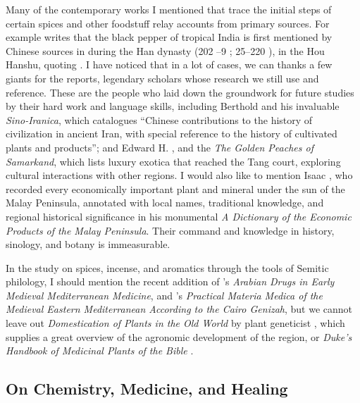 
Many of the contemporary works I mentioned that trace the initial steps of certain spices and other foodstuff relay accounts from primary sources. For example \textcite{spengler_spices_2019} writes that the black pepper of tropical India is first mentioned by Chinese sources in during the Han dynasty (202 \BC{}--9 \AD{}; 25--220 \AD{}), in the \gls{Hou Hanshu}, quoting \textcite[374]{laufer_sino-iranica_1919}. I have noticed that in a lot of cases, we can thanks a few giants for the reports, legendary scholars whose research we still use and reference. These are the people who laid down the groundwork for future studies by their hard work and language skills, including Berthold \textcite{laufer_sino-iranica_1919} and his invaluable \textit{Sino-Iranica}, which catalogues ``Chinese contributions to the history of civilization in ancient Iran, with special reference to the history of cultivated plants and products''; and Edward H. \textcite{schafer_golden_1985}, and the \textit{The Golden Peaches of Samarkand}, which lists luxury exotica that reached the Tang court, exploring cultural interactions with other regions. I would also like to mention Isaac \textcite{burkill_dictionary_1935}, who recorded every economically important plant and mineral under the sun of the Malay Peninsula, annotated with local names, traditional knowledge, and regional historical significance in his monumental \textit{A Dictionary of the Economic Products of the Malay Peninsula}. Their command and knowledge in history, sinology, and botany is immeasurable.

In the study on spices, incense, and aromatics through the tools of Semitic philology, I should mention the recent addition of \textcite{amar_arabian_2017}'s \textit{Arabian Drugs in Early Medieval Mediterranean Medicine}, and \textcite{lev_practical_2008}'s \textit{Practical Materia Medica of the Medieval Eastern Mediterranean According to the Cairo Genizah}, but we cannot leave out \textit{Domestication of Plants in the Old World} by plant geneticist \textcite{zohary_domestication_2012}, which supplies a great overview of the agronomic development of the region, or \textit{Duke's Handbook of Medicinal Plants of the Bible} \autocite{duke_dukes_2008}.


\subsection{On Chemistry, Medicine, and Healing}

